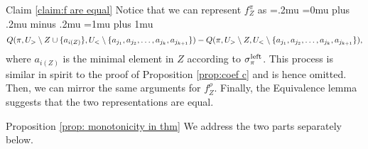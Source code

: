 \begin{proofof}{Claim \ref{claim:f are equal}}
Notice that we can represent $f^\pi_Z$ as 
{\thinmuskip=.2mu
\medmuskip=0mu plus .2mu minus .2mu
\thickmuskip=1mu plus 1mu
\[
Q(\pi,U_>\setminus Z \cup \{a_{i(Z)}\}, U_<\setminus \{a_{j_1},a_{j_2},\dots,a_{j_{k}},a_{j_{k+1}} \})-Q(\pi,U_>\setminus Z, U_<\setminus \{a_{j_1},a_{j_2},\dots,a_{j_{k}},a_{j_{k+1}} \}),
\]}%
where $a_{i(Z)}$ is the minimal element in $Z$ according to $\sigma^{\textnormal{left}}_\pi$. This process is similar in spirit to the proof of Proposition \ref{prop:coef c} and is hence omitted. Then, we can mirror the same arguments for $f^\rho_Z$. Finally, the Equivalence lemma suggests that the two representations are equal.
\end{proofof}


\begin{proofof}{Proposition \ref{prop: monotonicity in thm}}
We address the two parts separately below.

\end{proofof}
